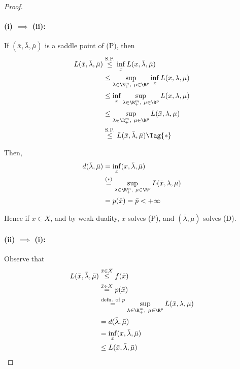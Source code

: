 \begin{proof}
  \paragraph{(i) $\implies$ (ii):}

  If $(\bar x,\bar\lambda,\bar\mu)$ is a saddle point of (P), then
  \begin{align*}
    L(\bar x,\bar\lambda,\bar\mu)
     & \stackrel{\text{S.P.}}{\leq}\inf_{x}L(x,\bar\lambda,\bar\mu)      \\
     & \leq\sup_{\lambda\in\R^m_+,\ \mu\in\R^p}\inf_{x}L(x,\lambda,\mu)  \\
     & \leq\inf_{x}\sup_{\lambda\in\R^m_+,\ \mu\in\R^p}L(x,\lambda,\mu)  \\
     & \leq\sup_{\lambda\in\R^m_+,\ \mu\in\R^p}L(\bar x,\lambda,\mu)     \\
     & \stackrel{\text{S.P.}}{\leq} L(\bar x,\bar\lambda,\bar\mu)\Tag{*}
  \end{align*}


  Then,
  \begin{align*}
    d(\bar\lambda,\bar\mu)
     & =\inf_{x} (x,\bar\lambda,\bar\mu)                                        \\
     & \stackrel{(*)}=\sup_{\lambda\in\R^m_+,\ \mu\in\R^p}L(\bar x,\lambda,\mu) \\
     & = p(\bar x) = \bar p<+\infty
  \end{align*}

  Hence if $x\in X$, and by weak duality, $\bar x$ solves (P), and
  $(\bar\lambda,\bar\mu)$ solves (D).

  \paragraph{(ii) $\implies$ (i):}

  Observe that
  \begin{align*}
    L(\bar x,\bar\lambda,\bar\mu)
     & \stackrel{\bar x\in X}{\leq} f(\bar x)                                                 \\
     & \stackrel{\bar x\in X}= p(\bar x)                                                      \\
     & \stackrel{\text{defn. of }p}=\sup_{\lambda\in\R^m_+,\ \mu\in\R^p}L(\bar x,\lambda,\mu) \\
     & =d(\bar\lambda,\bar\mu)                                                                \\
     & =\inf_{x} (x,\bar\lambda,\bar\mu)                                                      \\
     & \leq L(\bar x,\bar\lambda,\bar\mu)                                                     \\
  \end{align*}


\end{proof}
